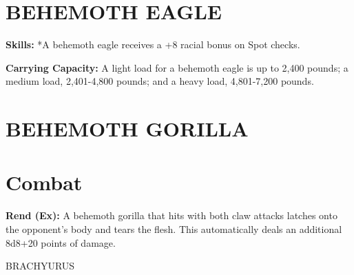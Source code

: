 \documentclass{article}
\begin{document}
\section*{BEHEMOTH EAGLE }

\textbf{Skills:} *A behemoth eagle receives a +8 racial bonus on Spot checks. 

\textbf{Carrying Capacity:} A light load for a behemoth eagle is up to 2,400 pounds; 
a medium load, 2,401-4,800 pounds; and a heavy load, 4,801-7,200 pounds. 

\section*{BEHEMOTH GORILLA }

\section*{Combat\textbf{ }}

\textbf{Rend (Ex):} A behemoth gorilla that hits with both claw attacks latches 
onto the opponent's body and tears the flesh. This automatically deals an additional 
8d8+20 points of damage. 

\vspace{12pt}
{\LARGE{}BRACHYURUS }
\end{document}
